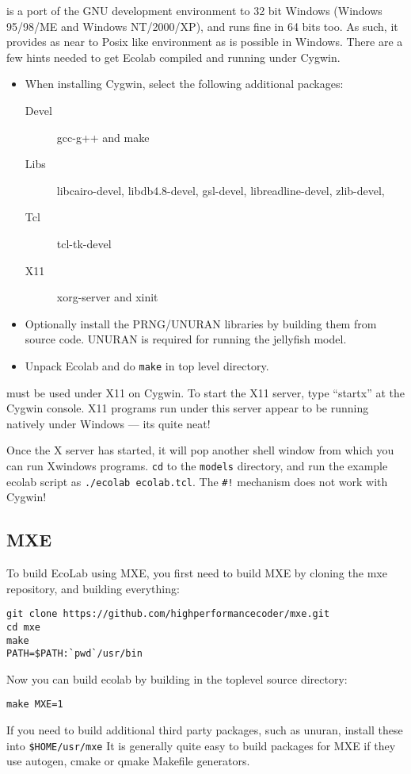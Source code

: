  is a
port of the GNU development environment to 32 bit Windows (Windows
95/98/ME and Windows NT/2000/XP), and runs fine in 64 bits too. As such, it provides as near to
Posix like environment as is possible in Windows. There are a few
hints needed to get Ecolab compiled and running under Cygwin.
\begin{itemize}
\item When installing Cygwin, select the following additional
  packages:
  \begin{description}
    \item[Devel] gcc-g++ and make
    \item[Libs] libcairo-devel, libdb4.8-devel, gsl-devel, libreadline-devel, zlib-devel,
    \item[Tcl] tcl-tk-devel
    \item[X11] xorg-server and xinit
  \end{description}
\item Optionally install the PRNG/UNURAN libraries by building them
  from source code. UNURAN is required for running the jellyfish model.
\item Unpack Ecolab and do {\tt make} in top level directory. 
\end{itemize}

\EcoLab{} must be used under X11 on Cygwin. To start the X11 server,
type ``startx'' at the Cygwin console. X11 programs run under this
server appear to be running natively under Windows --- its quite neat!

Once the X server has started, it will pop another shell window from
which you can run Xwindows programs. {\tt cd} to the {\tt models}
directory, and run the example ecolab script as {\tt ./ecolab
  ecolab.tcl}. The \verb+#!+ mechanism does not work with Cygwin!

\subsection{MXE}

To build EcoLab using MXE, you first need to build MXE by cloning the
mxe repository, and building everything:
\begin{verbatim}
git clone https://github.com/highperformancecoder/mxe.git
cd mxe
make
PATH=$PATH:`pwd`/usr/bin
\end{verbatim}
Now you can build ecolab by building in the toplevel source directory:
\begin{verbatim}
make MXE=1
\end{verbatim}
If you need to build additional third party packages, such as unuran,
install these into \verb+$HOME/usr/mxe+ It is generally quite easy to
build packages for MXE if they use autogen, cmake or qmake Makefile
generators.

